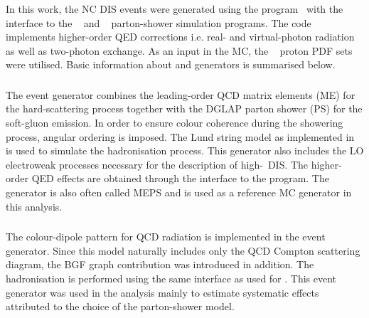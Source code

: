 In this work, the NC DIS events were generated using the \heracles program~\cite{cpc:69:155} with the \djangoh~\cite{cpc:81:381} interface to the \lepto~\cite{Ingelman:1996mq} and \ariadne~\cite{cpc:71:15,Lonnblad:1994wk} parton-shower simulation programs. The \djangoh code implements higher-order QED corrections i.e. real- and virtual-photon radiation as well as two-photon exchange. As an input in the MC, the \cteqfived~\cite{pr:d51:4763} proton PDF sets were utilised. Basic information about \lepto and \ariadne generators is summarised below.

\subsubsection{\lepto}
The \lepto event generator combines the leading-order QCD matrix elements (ME) for the hard-scattering process together with the DGLAP parton shower (PS) for the soft-gluon emission. In order to ensure colour coherence during the showering process, angular ordering is imposed. The Lund string model as implemented in \jetset~\cite{cpc:43:367} is used to simulate the hadronisation process. This generator also includes the LO electroweak processes necessary for the description of high-\qsq~DIS. The higher-order QED effects are obtained through the interface to the \heracles program. The \lepto generator is also often called MEPS and is used as a reference MC generator in this analysis.
\subsubsection{\ariadne}
The colour-dipole pattern for QCD radiation is implemented in the \ariadne event generator. Since this model naturally includes only the QCD Compton scattering diagram, the BGF graph contribution was introduced in addition. The hadronisation is performed using the same \jetset interface as used for \lepto. This event generator was used in the analysis mainly to estimate systematic effects attributed to the choice of the parton-shower model.
